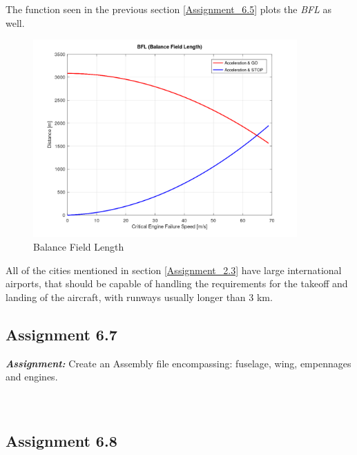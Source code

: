\documentclass{article}
\begin{document}
The function seen in the previous section \ref{Assignment_6.5} plots the \textit{BFL} as well. \\ 

\begin{figure}[h!]
    \centering
    \includegraphics[width=0.9\textwidth]{Sources/Plots_and_Pictures/BFL.png}
    \caption{Balance Field Length}
    \label{BFL}
\end{figure}

All of the cities mentioned in section \ref{Assignment_2.3} have large international airports, that should be 
capable of handling the requirements for the takeoff and landing of the aircraft, with runways usually longer than 3 km. \\

\clearpage






\subsection{Assignment 6.7\label{Assignment_6.7}}

\textbf{\textit{Assignment:}} Create an Assembly file encompassing: 
fuselage, wing, empennages and engines. \\ \\ \\ 

\clearpage

\subsection{Assignment 6.8\label{Assignment_6.8}}
\end{document}

